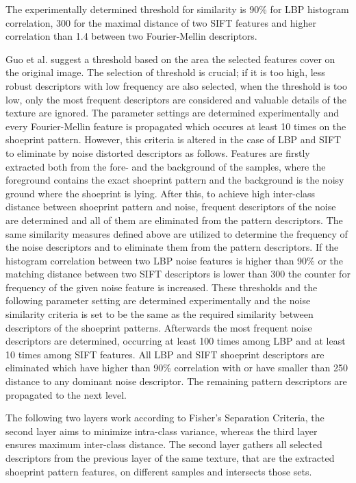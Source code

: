 \documentclass[draft,final]{vutinfth} %
\begin{document}
The experimentally determined threshold for similarity is  90\% for LBP histogram correlation, 300 for the maximal distance of two SIFT features and higher correlation than 1.4 between two Fourier-Mellin descriptors.
\par
Guo et al. \cite{guo2012discriminative} suggest a threshold based on the area the selected features cover on the original image.
The selection of threshold is crucial; if it is too high, less robust descriptors with low frequency are also selected, when the threshold is too low, only the most frequent descriptors are considered and valuable details of the texture are ignored.
The parameter settings are determined experimentally and every Fourier-Mellin feature is propagated which occures at least 10 times on the shoeprint pattern.
However, this criteria is altered in the case of LBP and SIFT to eliminate by noise distorted descriptors as follows.
Features are firstly extracted both from the fore- and the background of the samples, where the foreground contains the exact shoeprint pattern and the background is the noisy ground where the shoeprint is lying. 
After this, to achieve high inter-class distance between shoeprint pattern and noise, frequent descriptors of the noise are determined and all of them are eliminated from the pattern descriptors.
The same similarity measures defined above are utilized to determine the frequency of the noise descriptors and to eliminate them from the pattern descriptors.
If the histogram correlation between two LBP noise features is higher than 90\% or the matching distance between two SIFT descriptors is lower than 300 the counter for frequency of the given noise feature is increased.
These thresholds and the following parameter setting are determined experimentally and the noise similarity criteria is set to be the same as the required similarity between descriptors of the shoeprint patterns.
Afterwards the most frequent noise descriptors are determined, occurring at least 100 times among LBP and at least 10 times among SIFT features.
All LBP and SIFT shoeprint descriptors are eliminated which have higher than 90\% correlation with or have smaller than 250 distance to any dominant noise descriptor.
The remaining pattern descriptors are propagated to the next level. 
\par
The following two layers work according to Fisher's Separation Criteria, the second layer aims to minimize intra-class variance, whereas the third layer ensures maximum inter-class distance. 
The second layer gathers all selected descriptors from the previous layer of the same texture, that are the extracted shoeprint pattern features, on different samples and intersects those sets.
\end{document}
